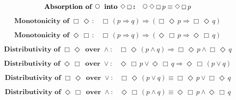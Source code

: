 \documentclass[12pt, fleqn, leqno]{article}
\newcommand{\impl}{\ensuremath{\Rightarrow}}        %
\newcommand{\Next}{\;\,\text{\raisebox{3.5pt}{\circle{6}}}}
\newcommand{\Event}{\Diamond\,}
\newcommand{\Always}{\Box\,}
\newcommand{\spacer}{\vspace{-30pt}}
\begin{document}
\spacer

\begin{equation}\label{E:absNextEventAlways}
\textbf{Absorption of $\Next$ into $\Event\Always$:}\quad \Next\Event\Always p \equiv \Event\Always p
\end{equation}

\spacer

\begin{equation}\label{E:monoAlwaysEvent}
\textbf{Monotonicity of $\Always\Event$:}\quad \Always (p \impl q) \impl (\Always\Event p \impl \Always\Event q)
\end{equation}

\spacer

\begin{equation}\label{E:monoEventAlways}
\textbf{Monotonicity of $\Event\Always$:}\quad \Always (p \impl q) \impl (\Event\Always p \impl \Event\Always q)
\end{equation}

\spacer

\begin{equation}\label{E:distAlwaysEventAnd}
\textbf{Distributivity of $\Always\Event$ over $\land$:}\quad \Always\Event(p \land q) \impl \Always\Event p \land \Always\Event q
\end{equation}

\spacer

\begin{equation}\label{E:distEventAlwaysOr}
\textbf{Distributivity of $\Event\Always$ over $\lor$:}\quad \Event\Always p \lor \Event\Always q \impl \Event\Always (p \lor q)
\end{equation}

\spacer

\begin{equation}\label{E:distAlwaysEventOr}
\textbf{Distributivity of $\Always\Event$ over $\lor$:}\quad \Always\Event(p \lor q) \equiv \Always\Event p \lor \Always\Event q
\end{equation}

\spacer

\begin{equation}\label{E:distEventAlwaysAnd}
\textbf{Distributivity of $\Event\Always$ over $\land$:}\quad \Event\Always(p \land q) \equiv \Event\Always p \land \Event\Always q
\end{equation}
\end{document}
